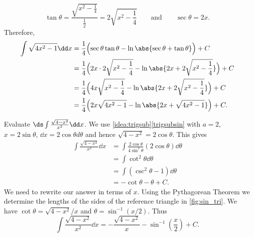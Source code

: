\begin{example}
\[\tan \theta = \frac{\sqrt{x^2-\frac14}}{\frac12} = 2\sqrt{x^2-\frac14}\qquad \text{and}\qquad\sec\theta = 2x.\]
Therefore,
\begin{align*}
	\int \sqrt{4x^2-1}\dd x
	& =\frac14\Bigl(\sec\theta\tan\theta -\ln\abs{\sec\theta+\tan\theta}\Bigr)+C \\
	&=\frac14\Bigl(2x\cdot 2\sqrt{x^2-\frac14} - \ln\abs{2x + 2\sqrt{x^2-\frac14}}\Bigr)+C\\
	&= \frac14\Bigl(4x\sqrt{x^2-\frac14}-\ln\abs{2x + 2\sqrt{x^2-\frac14}}\Bigr)+C \\
	& = \frac14\Bigl(2x\sqrt{4x^2-1} - \ln\abs{2x + \sqrt{4x^2-1}}\Bigr)+C.
\end{align*}
\end{example}

\begin{example}\label{ex_trigsub4}%
Evaluate $\ds \int \frac{\sqrt{4-x^2}}{x^2}\dd x$.
\solution
We use \autoref{idea:trigsub}\ref*{trigsubsin} with $a=2$, $x=2\sin \theta$, $\dd x = 2\cos \theta d\theta$ and hence $\sqrt{4-x^2} = 2\cos\theta$. This gives
\begin{align*}
\int \frac{\sqrt{4-x^2}}{x^2}\dd x &= \int \frac{2\cos\theta}{4\sin^2\theta}(2\cos\theta)\dd\theta\\
		&= \int \cot^2\theta\dd\theta\\
		&=	\int (\csc^2\theta -1)\dd\theta\\
		&= -\cot\theta -\theta + C.
\end{align*}
%
%
%
We need to rewrite our answer in terms of $x$. Using the Pythagorean Theorem we determine the lengths of the sides of the reference triangle in \autoref{fig:sin_tri}. We have $\cot\theta = \sqrt{4-x^2}/x$ and $\theta = \sin^{-1}(x/2)$. Thus
\[\int \frac{\sqrt{4-x^2}}{x^2}\dd x = -\frac{\sqrt{4-x^2}}x-\sin^{-1}\left(\frac x2\right) + C.\]
\end{example}

